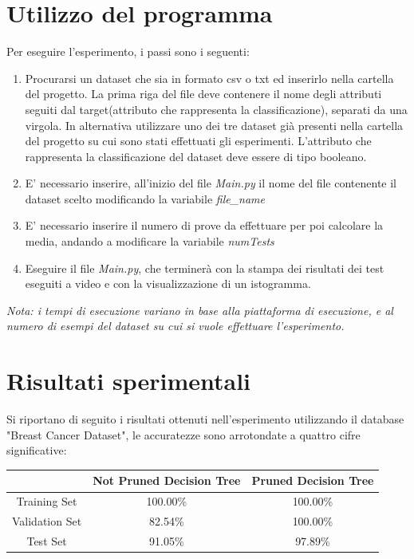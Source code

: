 \documentclass[]{article}
\begin{document}
\section*{Utilizzo del programma}
Per eseguire l'esperimento, i passi sono i seguenti:
\begin{enumerate}

\item Procurarsi un dataset che sia in formato csv o txt ed inserirlo nella cartella del progetto. La prima riga del file deve contenere il nome degli attributi seguiti dal target(attributo che rappresenta la classificazione), separati da una virgola. In alternativa utilizzare uno dei tre dataset già presenti nella cartella del progetto su cui sono stati effettuati gli esperimenti. L'attributo che rappresenta la classificazione del dataset deve essere di tipo booleano.

\item E' necessario inserire, all'inizio del file \textit{Main.py} il nome del file contenente il dataset scelto modificando la variabile \textit{file\_name}

\item E' necessario inserire il numero di prove da effettuare per poi calcolare la media, andando a modificare la variabile \textit{numTests}

\item Eseguire il file \textit{Main.py}, che terminerà con la stampa dei risultati dei test eseguiti a video e con la visualizzazione di un istogramma.
\end{enumerate}


\textit{Nota: i tempi di esecuzione variano in base alla piattaforma di esecuzione, e al numero di esempi del dataset su cui si vuole effettuare l'esperimento.}

\section*{Risultati sperimentali}

Si riportano di seguito i risultati ottenuti nell'esperimento utilizzando il database "Breast Cancer Dataset", le accuratezze sono arrotondate a quattro cifre significative:\\

\begin{center}

\begin{tabular}{|c|c|c|}

\hline
& Not Pruned Decision Tree & Pruned Decision Tree \\
\hline
Training Set & 100.00\% & 100.00\% \\
\hline
Validation Set & 82.54\% & 100.00\% \\
\hline
Test Set & 91.05\% & 97.89\% \\
\hline

\end{tabular}
\end{center}
\end{document}
